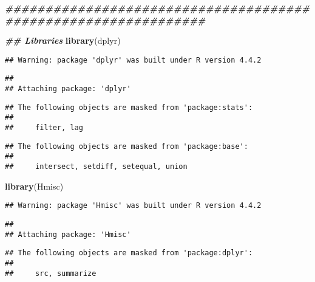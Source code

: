 \documentclass[
]{article}
\newenvironment{Shaded}{\begin{snugshade}}{\end{snugshade}}
\newcommand{\DocumentationTok}[1]{\textcolor[rgb]{0.56,0.35,0.01}{\textbf{\textit{#1}}}}
\newcommand{\FunctionTok}[1]{\textcolor[rgb]{0.13,0.29,0.53}{\textbf{#1}}}
\newcommand{\NormalTok}[1]{#1}
\begin{document}
\begin{Shaded}
\begin{Highlighting}[]
\DocumentationTok{\#\#\#\#\#\#\#\#\#\#\#\#\#\#\#\#\#\#\#\#\#\#\#\#\#\#\#\#\#\#\#\#\#\#\#\#\#\#\#\#\#\#\#\#\#\#\#\#\#\#\#\#\#\#\#\#\#\#\#\#\#\#\#}
\end{Highlighting}
\end{Shaded}

\begin{Shaded}
\begin{Highlighting}[]
\DocumentationTok{\#\# Libraries}
\FunctionTok{library}\NormalTok{(dplyr)}
\end{Highlighting}
\end{Shaded}

\begin{verbatim}
## Warning: package 'dplyr' was built under R version 4.4.2
\end{verbatim}

\begin{verbatim}
## 
## Attaching package: 'dplyr'
\end{verbatim}

\begin{verbatim}
## The following objects are masked from 'package:stats':
## 
##     filter, lag
\end{verbatim}

\begin{verbatim}
## The following objects are masked from 'package:base':
## 
##     intersect, setdiff, setequal, union
\end{verbatim}

\begin{Shaded}
\begin{Highlighting}[]
\FunctionTok{library}\NormalTok{(Hmisc)}
\end{Highlighting}
\end{Shaded}

\begin{verbatim}
## Warning: package 'Hmisc' was built under R version 4.4.2
\end{verbatim}

\begin{verbatim}
## 
## Attaching package: 'Hmisc'
\end{verbatim}

\begin{verbatim}
## The following objects are masked from 'package:dplyr':
## 
##     src, summarize
\end{verbatim}
\end{document}
